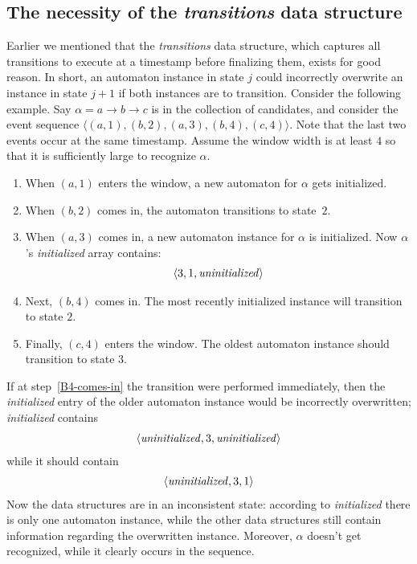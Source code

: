 \subsection{The necessity of the \emph{transitions} data structure}
\label{sec:transitions}

Earlier we mentioned that the \emph{transitions} data structure, which captures all transitions to execute at a timestamp before finalizing them, exists for good reason. In short, an automaton instance in state $ j $ could incorrectly overwrite an instance in state $ j + 1 $ if both instances are to transition. Consider the following example. Say $ \alpha = a \to b \to c $ is in the collection of candidates, and consider the event sequence $ \langle (a, 1),\allowbreak(b, 2),\allowbreak(a, 3),\allowbreak(b, 4),\allowbreak(c, 4) \rangle $. Note that the last two events occur at the same timestamp. Assume the window width is at least $ 4 $ so that it is sufficiently large to recognize $ \alpha $.

\begin{enumerate}
\item When $ (a, 1) $ enters the window, a new automaton for $ \alpha $ gets initialized.
\item When $ (b, 2) $ comes in, the automaton transitions to state~$ 2 $.
\item When $ (a, 3) $ comes in, a new automaton instance for $ \alpha $ is initialized. Now $ \alpha $'s \emph{initialized} array contains:
\begin{align*}
\langle 3, 1, \text{\textit{uninitialized}} \rangle
\end{align*}
\item Next, $ (b, 4) $ comes in. The most recently initialized instance will transition to state $ 2 $. \label{B4-comes-in}
\item Finally, $ (c, 4) $ enters the window. The oldest automaton instance should transition to state $ 3 $.
\end{enumerate}

If at step~\ref{B4-comes-in} the transition were performed immediately, then the \emph{initialized} entry of the older automaton instance would be incorrectly overwritten; \emph{initialized} contains
\begin{align*}
\langle \text{\textit{uninitialized}}, 3, \text{\textit{uninitialized}} \rangle
\end{align*}
while it should contain
\begin{align*}
\langle \text{\textit{uninitialized}}, 3, 1 \rangle
\end{align*}
Now the data structures are in an inconsistent state: according to \emph{initialized} there is only one automaton instance, while the other data structures still contain information regarding the overwritten instance. Moreover, $ \alpha $ doesn't get recognized, while it clearly occurs in the sequence.

